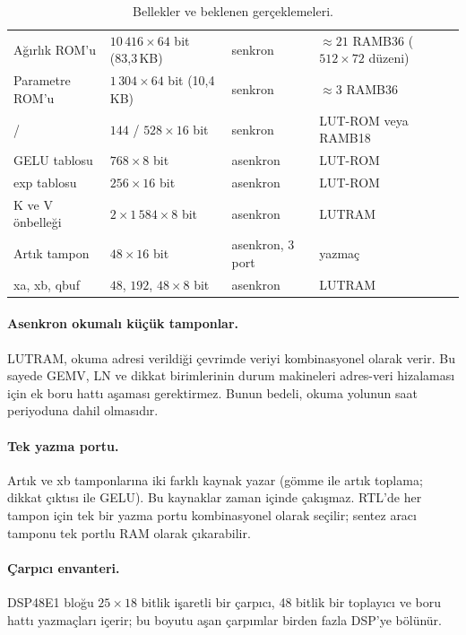 \begin{table}[h]
  \centering\small
  \caption{Bellekler ve beklenen gerçeklemeleri.}
  \label{tab:bellek}
  \begin{tabularx}{\textwidth}{@{}lllL@{}}
    \toprule
     &  &  &  \\ \midrule
    Ağırlık ROM'u & $10\,416\times64$ bit (83,3\,KB) & senkron & $\approx21$ RAMB36 ($512\times72$ düzeni) \\
    Parametre ROM'u & $1\,304\times64$ bit (10,4\,KB) & senkron & $\approx3$ RAMB36 \\
     /  & $144$ / $528\times16$ bit & senkron & LUT-ROM veya RAMB18 \\
    GELU tablosu & $768\times8$ bit & asenkron & LUT-ROM \\
    exp tablosu & $256\times16$ bit & asenkron & LUT-ROM \\
    K ve V önbelleği & $2\times1\,584\times8$ bit & asenkron & LUTRAM \\
    Artık tampon & $48\times16$ bit & asenkron, 3 port & yazmaç \\
    xa, xb, qbuf & $48$, $192$, $48\times8$ bit & asenkron & LUTRAM \\ \bottomrule
  \end{tabularx}
\end{table}

\paragraph{Asenkron okumalı küçük tamponlar.} LUTRAM, okuma adresi verildiği çevrimde veriyi kombinasyonel olarak verir. Bu sayede GEMV, LN ve dikkat birimlerinin durum makineleri adres-veri hizalaması için ek boru hattı aşaması gerektirmez. Bunun bedeli, okuma yolunun saat periyoduna dahil olmasıdır.

\paragraph{Tek yazma portu.} Artık ve xb tamponlarına iki farklı kaynak yazar (gömme ile artık toplama; dikkat çıktısı ile GELU). Bu kaynaklar zaman içinde çakışmaz. RTL'de her tampon için tek bir yazma portu kombinasyonel olarak seçilir; sentez aracı tamponu tek portlu RAM olarak çıkarabilir.

\paragraph{Çarpıcı envanteri.} DSP48E1 bloğu $25\times18$ bitlik işaretli bir çarpıcı, 48 bitlik bir toplayıcı ve boru hattı yazmaçları içerir; bu boyutu aşan çarpımlar birden fazla DSP'ye bölünür.

